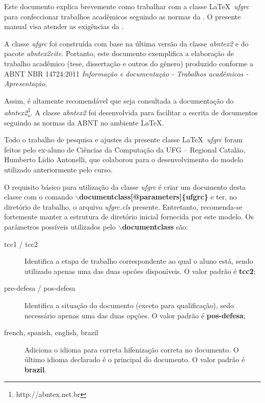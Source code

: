 \newcommand{\comando}[1]{\textbf{$\backslash$#1}}

Este documento explica brevemente como trabalhar com a classe \LaTeX~\textit{ufgrc} para confeccionar trabalhos acadêmicos seguindo as normas da \cite{NBR14724:2011}. O presente manual visa atender as exigências da .


A classe \textit{ufgrc} foi construída com base na última versão da classe \textit{abntex2} e do pacote \textit{abntex2cite}. Portanto, este documento exemplifica a elaboração de trabalho
acadêmico (tese, dissertação e outros do gênero) produzido conforme a ABNT NBR
14724:2011 \textit{Informação e documentação - Trabalhos acadêmicos - Apresentação}.

Assim, é altamente recomendável que seja consultada a documentação do \textit{abntex2}\footnote{http://abntex.net.br}. A classe \textit{abntex2} foi desenvolvida para facilitar a escrita de documentos seguindo as normas da ABNT no ambiente \LaTeX\;\cite{frasson:2005:classe_abnt}.

Todo o trabalho de pesquisa e ajustes da presente classe \LaTeX~\emph{ufgrc} foram feitos pelo ex-aluno de Ciências da Computação da UFG -- Regional Catalão, Humberto Lidio Antonelli, que colaborou para o desenvolvimento do modelo utilizado anteriormente pelo curso.

O requisito básico para utilização da classe \textit{ufgrc} é criar um documento desta classe com o comando
\comando{documentclass[@parameters]\{ufgrc\}} e ter, no diretório de trabalho, o arquivo \emph{ufgrc.cls} presente. Entretanto, recomenda-se fortemente manter a estrutura de diretório inicial fornecida por este modelo. Os parâmetros possíveis utilizados pelo \comando{documentclass} são:
\begin{description}
    \item[tcc1 / tcc2] Identifica a etapa de trabalho correspondente ao qual o aluno está, sendo utilizado apenas uma das duas opcões disponíveis. O valor padrão é \textbf{tcc2};
    
    \item[pre-defesa / pos-defesa] Identifica a situação do documento (exceto para qualificação), sedo necessário apenas uma das duas opções. O valor padrão é \textbf{pos-defesa};
    
    \item[french, spanish, english, brazil] Adiciona o idioma para correta hifenização correta no documento. O último idioma declarado é o principal do documento. O valor padrão é \textbf{brazil}.
\end{description}

{}
